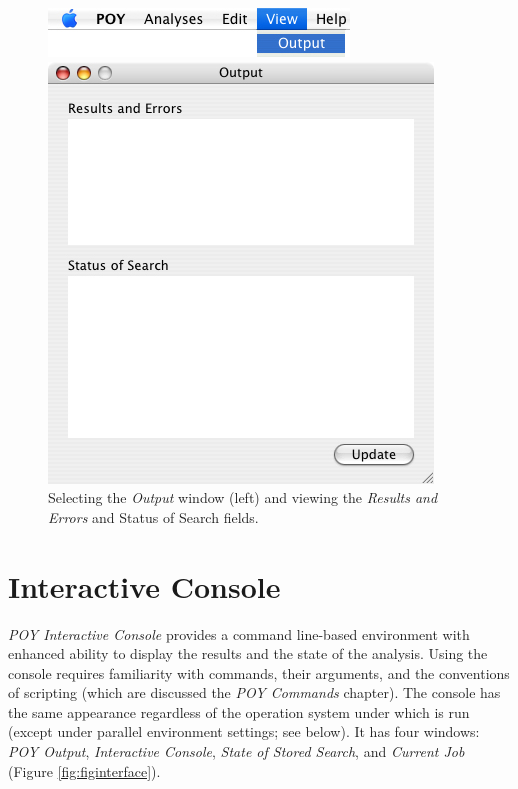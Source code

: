 \begin{figure}
\centering
\begin{minipage}[c]{0.48\textwidth}
   		\includegraphics[width=\textwidth]{figures/View_Menu.jpg}
\end{minipage}
\quad
\begin{minipage}[c]{0.48\textwidth}
	   	\includegraphics[width=\textwidth]{figures/output_window.jpg}
   	\end{minipage}
\caption{Selecting the \emph{Output} window (left) and viewing the \emph{Results and Errors} and  {Status of Search} fields.}
\label{fig:results_and_status_windows}
\end{figure}

\section{\poy Interactive Console}

\emph{POY Interactive Console} provides a command line-based environment with enhanced ability to display the results and the state of the analysis. Using the console requires familiarity with \poy commands, their arguments, and the conventions of \poy scripting (which are discussed the \emph{POY Commands} chapter). The console has the same appearance regardless of the operation system under which \poy is run (except under parallel environment settings; see below). It has four windows: \emph{POY Output}, \emph{Interactive Console}, \emph{State of Stored Search}, and \emph{Current Job} (Figure \ref{fig:figinterface}).

